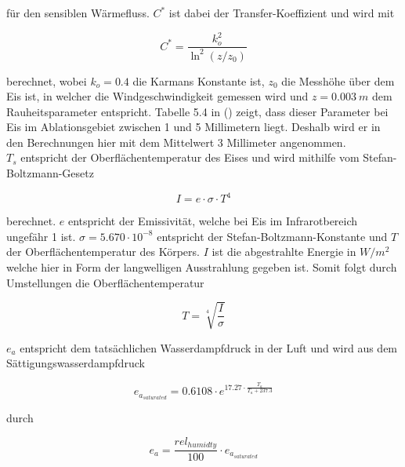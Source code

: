 \documentclass[11pt,a4paper]{article}
\begin{document}
für den sensiblen Wärmefluss. $C^*$ ist dabei der Transfer-Koeffizient und wird mit 

\begin{equation}\label{eq:Transfer-Koeffizient}
C^{*}=\frac{k_{o}^{2}}{\ln ^{2}\left(z / z_{0}\right)}
\end{equation}

berechnet, wobei $k_{o}=0.4$ die Karmans Konstante ist, $z_{0}$ die Messhöhe über dem Eis ist, in welcher die Windgeschwindigkeit gemessen wird und $z=0.003~m$ dem Rauheitsparameter entspricht. Tabelle 5.4 in \citeauthor{ThePhysicsOfGlaciers} (\citeyear[155]{ThePhysicsOfGlaciers}) zeigt, dass dieser Parameter bei Eis im Ablationsgebiet zwischen 1 und 5 Millimetern liegt. Deshalb wird er in den Berechnungen hier mit dem Mittelwert 3 Millimeter angenommen.\\ %

$T_s$ entspricht der Oberflächentemperatur des Eises und wird mithilfe vom Stefan-Boltzmann-Gesetz 

\begin{equation}\label{eq:Boltzmann-Gesetz}
I = e \cdot \sigma \cdot T^4
\end{equation}

berechnet. $e$ entspricht der Emissivität, welche bei Eis im Infrarotbereich ungefähr 1 ist. $\sigma=5.670 \cdot 10^{-8}$ entspricht der Stefan-Boltzmann-Konstante und $T$ der Oberflächentemperatur des Körpers. $I$ ist die abgestrahlte Energie in $W/m^2$ welche hier in Form der langwelligen Ausstrahlung gegeben ist. Somit folgt durch Umstellungen die Oberflächentemperatur

\begin{equation}\label{eq:Oberflächentemperatur}
T = \sqrt[4]{\frac{I}{\sigma}}
\end{equation}


$e_a$ entspricht dem tatsächlichen Wasserdampfdruck in der Luft und wird aus dem Sättigungswasserdampfdruck


\begin{equation}
e_{a_{saturated}}=0.6108 \cdot e^{17.27 \cdot \frac{T_a}{T_a + 237.3}}
\end{equation}

durch

\begin{equation}
e_a = \frac{rel_{humidty}}{100} \cdot e_{a_{saturated}}
\end{equation}
\end{document}
